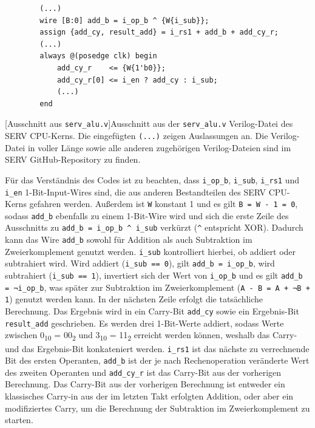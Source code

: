     \begin{verbatim}
        (...)
        wire [B:0] add_b = i_op_b ^ {W{i_sub}};
        assign {add_cy, result_add} = i_rs1 + add_b + add_cy_r;
        (...)
        always @(posedge clk) begin
            add_cy_r    <= {W{1'b0}};
            add_cy_r[0] <= i_en ? add_cy : i_sub;
            (...)
        end
    \end{verbatim}
    [Ausschnitt aus \texttt{serv\_alu.v}]{Ausschnitt aus der \texttt{serv\_alu.v} Verilog-Datei des SERV CPU-Kerns. Die eingefügten \texttt{(...)} zeigen Auslassungen an. Die Verilog-Datei in voller Länge sowie alle anderen zugehörigen Verilog-Dateien sind im SERV GitHub-Repository \parencite{kindgren_serv} zu finden.}
    \label{lst:serv_alu.v}

    Für das Verständnis des Codes ist zu beachten, dass \verb|i_op_b|, \verb|i_sub|, \verb|i_rs1| und \verb|i_en| 1-Bit-Input-Wires sind, die aus anderen Bestandteilen des SERV CPU-Kerns gefahren werden.
    Außerdem ist \verb|W| konstant 1 und es gilt \verb|B = W - 1 = 0|, sodass \verb|add_b| ebenfalls zu einem 1-Bit-Wire wird und sich die erste Zeile des Ausschnitts zu \verb|add_b = i_op_b ^ i_sub| verkürzt (\verb|^| entspricht XOR).
    Dadurch kann das Wire \verb|add_b| sowohl für Addition als auch Subtraktion im Zweierkomplement genutzt werden.
    \verb|i_sub| kontrolliert hierbei, ob addiert oder subtrahiert wird.
    Wird addiert (\verb|i_sub == 0|), gilt \verb|add_b = i_op_b|, wird subtrahiert (\verb|i_sub == 1|), invertiert sich der Wert von \verb|i_op_b| und es gilt \verb|add_b = ¬i_op_b|, was später zur Subtraktion im Zweierkomplement (\verb|A - B = A + ¬B + 1|) genutzt werden kann.
    In der nächsten Zeile erfolgt die tatsächliche Berechnung.
    Das Ergebnis wird in ein Carry-Bit \verb|add_cy| sowie ein Ergebnis-Bit \verb|result_add| geschrieben.
    Es werden drei 1-Bit-Werte addiert, sodass Werte zwischen 0\textsubscript{10} = 00\textsubscript{2} und 3\textsubscript{10} = 11\textsubscript{2} erreicht werden können, weshalb das Carry- und das Ergebnis-Bit konkateniert werden.
    \verb|i_rs1| ist das nächste zu verrechnende Bit des ersten Operanten, \verb|add_b| ist der je nach Rechenoperation veränderte Wert des zweiten Operanten und \verb|add_cy_r| ist das Carry-Bit aus der vorherigen Berechnung.
    Das Carry-Bit aus der vorherigen Berechnung ist entweder ein klassisches Carry-in aus der im letzten Takt erfolgten Addition, oder aber ein modifiziertes Carry, um die Berechnung der Subtraktion im Zweierkomplement zu starten.
